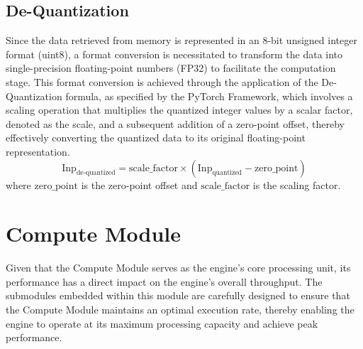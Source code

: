 \subsection{De-Quantization}
Since the data retrieved from memory is represented in an 8-bit unsigned integer format (uint8), a format conversion is necessitated to transform the data into single-precision floating-point numbers (FP32) to facilitate the computation stage. This format conversion is achieved through the application of the De-Quantization formula, as specified by the PyTorch Framework, which involves a scaling operation that multiplies the quantized integer values by a scalar factor, denoted as the scale, and a subsequent addition of a zero-point offset, thereby effectively converting the quantized data to its original floating-point representation.
\begin{equation*}
\text{Inp}_{\text{de-quantized}} = \text{scale\_factor} \times (\text{Inp}_{\text{quantized}} - \text{zero\_point})
\end{equation*}
where \( \text{zero\_point} \) is the zero-point offset and \( \text{scale\_factor} \) is the scaling factor.


\section{Compute Module}
Given that the Compute Module serves as the engine's core processing unit, its performance has a direct impact on the engine's overall throughput. The submodules embedded within this module are carefully designed to ensure that the Compute Module maintains an optimal execution rate, thereby enabling the engine to operate at its maximum processing capacity and achieve peak performance.
